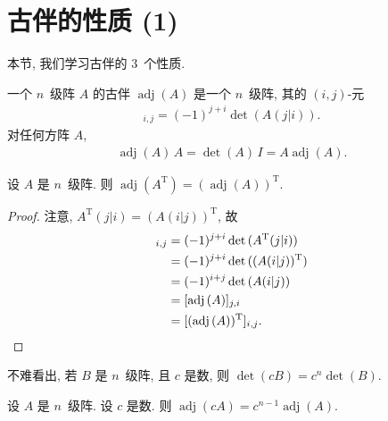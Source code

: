 \documentclass[../libro.tex]{subfiles}
\begin{document}
\section{古伴的性质 (1)}

本节, 我们学习古伴的 \(3\)~个性质.

一个 \(n\)~级阵 \(A\) 的古伴 \(\operatorname{adj} {(A)}\)
是一个 \(n\)~级阵,
其的 \((i, j)\)-元
\begin{align*}
    [\operatorname{adj} {(A)}]_{i,j} = (-1)^{j+i} \det {(A(j|i))}.
\end{align*}
对任何方阵 \(A\),
\begin{align*}
    \operatorname{adj} {(A)}\, A
    = \det {(A)}\, I
    = A \operatorname{adj} {(A)}.
\end{align*}

\begin{theorem}
    设 \(A\) 是 \(n\)~级阵.
    则 \(\operatorname{adj} {(A^{\mathrm{T}})}
    = (\operatorname{adj} {(A)})^{\mathrm{T}}\).
\end{theorem}

\begin{proof}
    注意,
    \(A^{\mathrm{T}} (j|i) = (A (i|j))^{\mathrm{T}}\),
    故
    \begin{align*}
        [\operatorname{adj} {(A^{\mathrm{T}})}]_{i,j}
        = {} &
        (-1)^{j+i} \det {(A^{\mathrm{T}} (j|i))}
        \\
        = {} &
        (-1)^{j+i} \det {((A (i|j))^{\mathrm{T}})}
        \\
        = {} &
        (-1)^{i+j} \det {(A (i|j))}
        \\
        = {} &
        [\operatorname{adj} {(A)}]_{j,i}
        \\
        = {} &
        [(\operatorname{adj} {(A)})^{\mathrm{T}}]_{i,j}.
        \qedhere
    \end{align*}
\end{proof}

不难看出, 若 \(B\) 是 \(n\)~级阵, 且 \(c\) 是数, 则
\(\det {(cB)} = c^n \det {(B)}\).

\begin{theorem}
    设 \(A\) 是 \(n\)~级阵.
    设 \(c\) 是数.
    则 \(\operatorname{adj} {(cA)}
    = c^{n-1} \operatorname{adj} {(A)}\).
\end{theorem}
\end{document}
